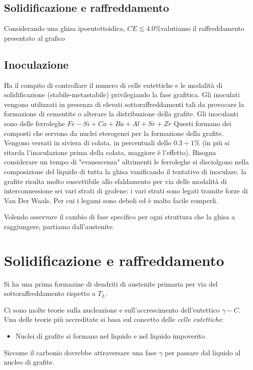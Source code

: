 \subsection{Solidificazione e raffreddamento}
Considerando una ghisa ipoeutettoidica, $CE \lesssim 4.0\%$valutiamo il raffreddamento presentato al grafico 


\subsection{Inoculazione}
Ha il compito di controllare il numero di celle eutettiche e le modalità di solidificazione (stabile-metastabile) privilegiando la fase grafitica.
Gli inoculati vengono utilizzati in presenza di elevati sottoraffreddamenti tali da provocare la formazione di cementite o alterare la distribuzione della grafite.
Gli inoculanti sono delle ferroleghe $Fe-Si + Ca + Ba + Al + Sr + Zr$
Questi formano dei composti che servono da nuclei eterogenei per la formazione della grafite.
Vengono versati in siviera di colata, in percentuali dello $0.3\div1\%$ (in più si ritarda l'inoculazione prima della colata, maggiore è l'effetto).
Bisogna considerare un tempo di "evanescenza" altrimenti le ferroleghe si disciolgono nella composizione del liquido di tutta la ghisa vanificando il tentativo di inoculare.
la grafite risulta molto suscettibile allo sfaldamento per via delle modalità di interconnessione sei vari strati di grafene: i vari strati sono legati tramite forze di Van Der Waals. Per cui i legami sono deboli ed è molto facile romperli.

Volendo osservare il cambio di fase specifico per ogni struttura che la ghisa a raggiungere, partiamo dall'austenite.

\section{Solidificazione e raffreddamento}
Si ha una prima formazine di dendriti di austenite primaria per via del sottoraffreddamento rispetto a $T_L$.

Ci sono molte teorie sulla nucleazione e sull'accrescimento dell'eutettico $\gamma - C$.
Una delle teorie più accreditate si basa sul concetto delle \textit{celle eutettiche}:
\begin{itemize}
\item Nuclei di grafite si formano nel liquido e nel liquido impoverito 
\todo{\\Completa}
\end{itemize}
Siccome il carbonio dovrebbe attraversare una fase $\gamma$ per passare dal liquido al nucleo di grafite.

